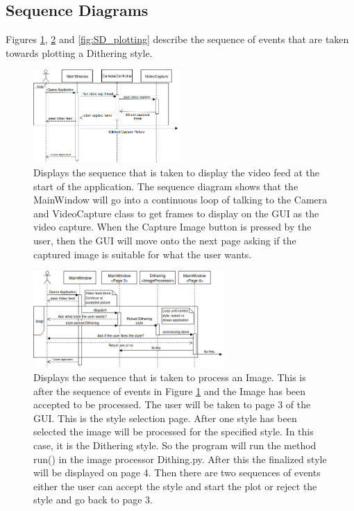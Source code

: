 \documentclass{article}
\begin{document}
\subsection{Sequence Diagrams}
Figures \ref{fig:SD_video_feed}, \ref{fig:SD_image_processing} and \ref{fig:SD_plotting} describe the sequence of events that are taken towards plotting a Dithering style. 
\begin{figure}[h]
    \centering
    \includegraphics[width=0.5\textwidth]{SD_video_feed.png}
    \caption{Displays the sequence that is taken to display the video feed at the start of the application. The sequence diagram shows that the MainWindow will go into a continuous loop of talking to the Camera and VideoCapture class to get frames to display on the GUI as the video capture. When the Capture Image button is pressed by the user, then the GUI will move onto the next page asking if the captured image is suitable for what the user wants.}
    \label{fig:SD_video_feed}
\end{figure}
\begin{figure}[h]
    \centering
    \includegraphics[width=0.65\textwidth]{SD_Image_Processing.png}
    \caption{Displays the sequence that is taken to process an Image. This is after the sequence of events in Figure \ref{fig:SD_video_feed} and the Image has been accepted to be processed. The user will be taken to page 3 of the GUI. This is the style selection page. After one style has been selected the image will be processed for the specified style. In this case, it is the Dithering style. So the program will run the method run() in the image processor Dithing.py. After this the finalized style will be displayed on page 4. Then there are two sequences of events either the user can accept the style and start the plot or reject the style and go back to page 3.}
    \label{fig:SD_image_processing}
\end{figure}
\end{document}
